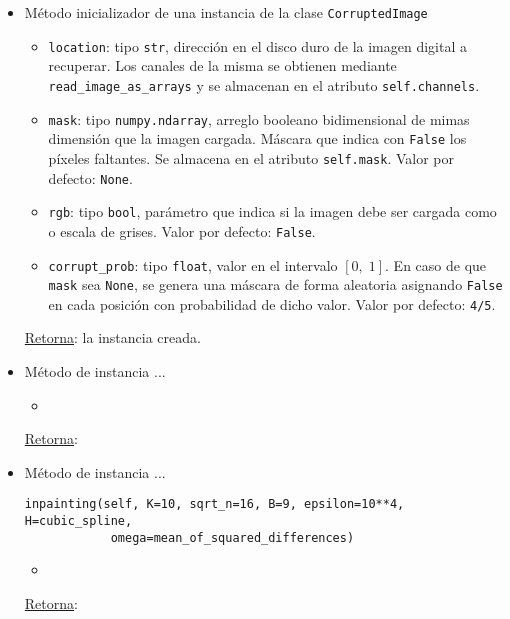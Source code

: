 \begin{itemize}
	\item M\'etodo inicializador de una instancia de la clase \texttt{CorruptedImage}
	
	\begin{itemize}
		\item \texttt{location}: tipo \texttt{str}, direcci\'on en el disco duro de la imagen digital a recuperar. Los canales de la misma se obtienen mediante \texttt{read\_image\_as\_arrays} y se almacenan en el atributo \texttt{self.channels}.
		\item \texttt{mask}: tipo \texttt{numpy.ndarray}, arreglo booleano bidimensional de mimas dimensi\'on que la imagen cargada. M\'ascara que indica con \texttt{False} los p\'ixeles faltantes. Se almacena en el atributo \texttt{self.mask}. Valor por defecto: \texttt{None}.
		\item \texttt{rgb}: tipo \texttt{bool}, par\'ametro que indica si la imagen debe ser cargada como \RGB o escala de grises. Valor por defecto: \texttt{False}.
		\item \texttt{corrupt\_prob}: tipo \texttt{float}, valor en el intervalo $[0,\; 1]$. En caso de que \texttt{mask} sea \texttt{None}, se genera una m\'ascara de forma aleatoria asignando \texttt{False} en cada posici\'on con probabilidad de dicho valor. Valor por defecto: \texttt{4/5}. 
	\end{itemize}
	\underline{Retorna}: la instancia creada.
	
	\item M\'etodo de instancia ...
	
	\begin{itemize}
		\item 
	\end{itemize}
	\underline{Retorna}:
	
	\item M\'etodo de instancia ...
	
	\begin{lstlisting}
inpainting(self, K=10, sqrt_n=16, B=9, epsilon=10**4, H=cubic_spline,
			omega=mean_of_squared_differences)
	\end{lstlisting}
	\begin{itemize}
		\item 
	\end{itemize}
	\underline{Retorna}:
\end{itemize}